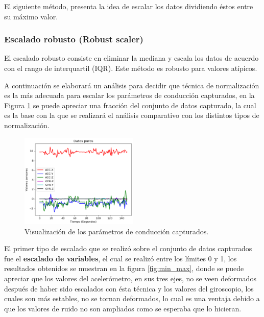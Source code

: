 El siguiente m\'{e}todo, presenta la idea de escalar los datos dividiendo \'{e}stos entre su m\'{a}ximo valor.

\subsubsection{Escalado robusto (Robust scaler)}

El escalado robusto consiste en eliminar la mediana y escala los datos de acuerdo con el rango de interquartil (IQR). Este m\'{e}todo es robusto para valores at\'{i}picos.

\vspace{5mm} %

A continuaci\'{o}n se elaborar\'{a} un an\'{a}lisis para decidir que t\'{e}cnica de normalizaci\'{o}n es la m\'{a}s adecuada para escalar los par\'{a}metros de conducci\'{o}n capturados, en la Figura \ref{fig:datos_puros} se puede apreciar una fracci\'{o}n del conjunto de datos capturado, la cual es la base con la que se realizar\'{a} el an\'{a}lisis comparativo con los distintos tipos de normalizaci\'{o}n.

\begin{figure}[h!]
  \begin{center}	\includegraphics[width=0.5\textwidth]{imagenes/Cap3/datosPuros}
  \caption{Visualizaci\'{o}n de los par\'{a}metros de conducci\'{o}n capturados.}
  \label{fig:datos_puros}
  \end{center}
\end{figure}

\vspace{5mm} %

El primer tipo de escalado que se realiz\'{o} sobre el conjunto de datos capturados fue el \textbf{escalado de variables}, el cual se realiz\'{o} entre los l\'{i}mites 0 y 1, los resultados obtenidos se muestran en la figura \ref{fig:min_max}, donde se puede apreciar que los valores del aceler\'{o}metro, en sus tres ejes, no se veen deformados despu\'{e}s de haber sido escalados con \'{e}sta t\'{e}cnica y los valores del giroscopio, los cuales son m\'{a}s estables, no se tornan deformados, lo cual es una ventaja debido a que los valores de ruido no son ampliados como se esperaba que lo hicieran.

